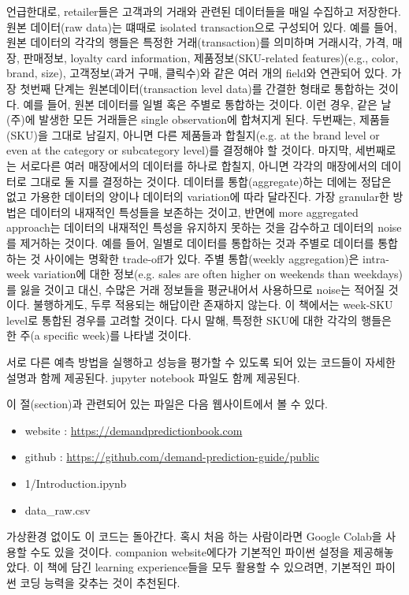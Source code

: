 \documentclass{report}
\begin{document}
언급한대로, retailer들은 고객과의 거래와 관련된 데이터들을 매일 수집하고 저장한다.
원본 데이터(raw data)는  떄때로 isolated transaction으로 구성되어 있다.
예를 들어, 원본 데이터의 각각의 행들은 특정한 거래(transaction)를 의미하며 거래시각, 가격, 매장, 판매정보, loyalty card information, 제품정보(SKU-related features)(e.g., color, brand, size), 고객정보(과거 구매, 클릭수)와 같은 여러 개의 field와 연관되어 있다.
가장 첫번째 단계는 원본데이터(transaction level data)를 간결한 형태로 통합하는 것이다.
예를 들어, 원본 데이터를 일별 혹은 주별로 통합하는 것이다.
이런 경우, 같은 날(주)에 발생한 모든 거래들은 single observation에 합쳐지게 된다.
두번째는, 제품들(SKU)을 그대로 남길지, 아니면 다른 제품들과 합칠지(e.g. at the brand level or even at the category or subcategory level)를 결정해야 할 것이다.
마지막, 세번째로는 서로다른 여러 매장에서의 데이터를 하나로 합칠지, 아니면 각각의 매장에서의 데이터로 그대로 둘 지를 결정하는 것이다.
데이터를 통합(aggregate)하는 데에는 정답은 없고 가용한 데이터의 양이나 데이터의 variation에 따라 달라진다.
가장 granular한 방법은 데이터의 내재적인 특성들을 보존하는 것이고, 반면에 more aggregated approach는 데이터의 내재적인 특성을 유지하지 못하는 것을 감수하고 데이터의 noise를 제거하는 것이다.
예를 들어, 일별로 데이터를 통합하는 것과 주별로 데이터를 통합하는 것 사이에는 명확한 trade-off가 있다.
주별 통합(weekly aggregation)은 intra-week variation에 대한 정보(e.g. sales are often higher on weekends than weekdays)를 잃을 것이고 대신, 수많은 거래 정보들을 평균내어서 사용하므로 noise는 적어질 것이다.
불행하게도, 두루 적용되는 해답이란 존재하지 않는다.
이 책에서는 week-SKU level로 통합된 경우를 고려할 것이다.
다시 말해, 특정한 SKU에 대한 각각의 행들은 한 주(a specific week)를 나타낼 것이다.

서로 다른 예측 방법을 실행하고 성능을 평가할 수 있도록 되어 있는 코드들이 자세한 설명과 함께 제공된다.
jupyter notebook 파일도 함께 제공된다.

이 절(section)과 관련되어 있는 파일은 다음 웹사이트에서 볼 수 있다.
\begin{itemize}
\item website : \url{https://demandpredictionbook.com}
\item github : \url{https://github.com/demand-prediction-guide/public}
\item 1/Introduction.ipynb
\item data\_raw.csv
\end{itemize}

가상환경 없이도 이 코드는 돌아간다.
혹시 처음 하는 사람이라면 Google Colab을 사용할 수도 있을 것이다.
companion website에다가 기본적인 파이썬 설정을 제공해놓았다.
이 책에 담긴 learning experience들을 모두 활용할 수 있으려면, 기본적인 파이썬 코딩 능력을 갖추는 것이 추천된다.
\end{document}
